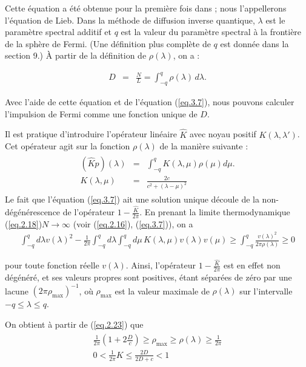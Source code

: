 Cette équation a été obtenue pour la première fois dans \cite{14} ; nous l'appellerons l'équation de Lieb. Dans la méthode de diffusion inverse quantique, \( \lambda \) est le paramètre spectral additif et \( q \) est la valeur du paramètre spectral à la frontière de la sphère de Fermi. (Une définition plus complète de \( q \) est donnée dans la section 9.) À partir de la définition de \( \rho(\lambda) \), on a :

\begin{eqnarray}
	D & = & \frac{N}{L} = \int_{-q}^q \rho(\lambda) \, d\lambda .	
\end{eqnarray}

Avec l'aide de cette équation et de l'équation (\ref{eq.3.7}), nous pouvons calculer l'impulsion de Fermi comme une fonction unique de \( D \).

Il est pratique d'introduire l'opérateur linéaire \( \hat{ K} \) avec noyau positif \( K(\lambda, \lambda') \). Cet opérateur agit sur la fonction \( \rho(\lambda) \) de la manière suivante :
\begin{eqnarray}
	\left . \begin{array}{rcl} ( \hat{K} p)(\lambda) & = &  \displaystyle \int_{-q}^{q} K(\lambda, \mu) \rho(\mu) d\mu. \\ K ( \lambda , \mu ) & = & \displaystyle \frac{ 2 c }{ c^2 + ( \lambda - \mu )^2 }  \end{array} \right .	
\end{eqnarray}
Le fait que l'équation (\ref{eq.3.7}) ait une solution unique découle de la non-dégénérescence de l'opérateur \( 1 - \frac{\hat{K}}{2\pi} \). En prenant la limite thermodynamique (\ref{eq.2.18})\( N \to \infty \) (voir (\ref{eq.2.16}), (\ref{eq.3.7})), on a
\begin{eqnarray}
	 \int_{-q}^q d\lambda v ( \lambda )^2 - \frac{1}{2\pi} \int_{-q}^q d \lambda \int_{-q}^q d\mu \, K ( \lambda , \mu ) v ( \lambda ) v ( \mu ) \geq \int_{-q}^{q} \frac{v(\lambda)^2}{2 \pi \rho ( \lambda ) }	\geq 0 
\end{eqnarray}


pour toute fonction réelle \( v(\lambda) \). Ainsi, l'opérateur \( 1 - \frac{\hat{K}}{2\pi} \) est en effet non dégénéré, et ses valeurs propres sont positives, étant séparées de zéro par une lacune \( (2\pi \rho_{\text{max}} )^{-1}\), où \( \rho_{\text{max}} \) est la valeur maximale de \( \rho(\lambda) \) sur l'intervalle \( -q \leq \lambda \leq q \).

On obtient à partir de (\ref{eq.2.23}) que
\begin{eqnarray}
\left . \begin{array}{c}  \displaystyle \frac{1}{2\pi} \left ( 1 + 2 \frac{D}{c} \right ) \geq \rho_{ \text{max}} \geq \rho ( \lambda ) \geq \frac{1}{2 \pi } \\ \displaystyle 0 < \frac{1}{2 \pi} K \leq \frac{2D}{2D +c} < 1 \end{array}\right.
\end{eqnarray}


